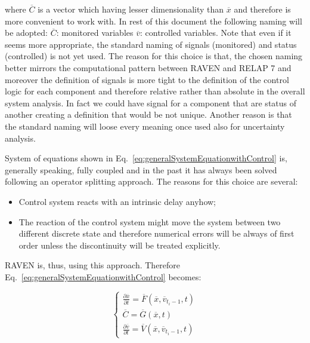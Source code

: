 \documentclass{mc2013}
\begin{document}
where 
$\overline{C}$
is a vector which having lesser dimensionality than
$\overline{x}$
and therefore is more convenient to work with. In rest of this document the following naming will be adopted: $\overline{C}$: monitored variables $\overline{v}$:
controlled variables.
Note that even if it seems more appropriate, the standard naming of signals (monitored)
and status (controlled) is not yet used. The reason for this choice is that, the chosen naming better mirrors
the computational pattern between RAVEN and RELAP 7 and moreover the definition of signals is more
tight to the definition of the control logic for each component and therefore relative rather than absolute in
the overall system analysis. In fact we could have signal for a component that are status of another creating
a definition that would be not unique. Another reason is that the standard naming will loose every meaning
once used also for uncertainty analysis.

\label{sec:operatorSplitting}

System of equations shown in Eq.~\ref{eq:generalSystemEquationwithControl} is, generally speaking, fully coupled and in the past it has always been solved following an operator splitting approach. The reasons for this choice are several:

\begin{itemize}
\item Control system reacts with an intrinsic delay anyhow;
\item The reaction of the control system might move the system between two different discrete state and
therefore numerical errors will be always of first order unless the discontinuity will be treated explicitly.
\end{itemize}

RAVEN is, thus, using this approach. Therefore Eq.~\ref{eq:generalSystemEquationwithControl} becomes:

\begin{equation}
\begin{cases} 
\frac{\partial \overline{x}}{\partial t} = \overline{F}(\overline{x},\overline{v}_{t_{i}-1},t) \\
\overline{C} = \overline{G}(\overline{x},t) \\ 
\frac{\partial \overline{v}}{\partial t} = \overline{V}(\overline{x},\overline{v}_{t_{i}-1},t) 
\end{cases}
\label{eq:generalSystemEquationwithControlSplitting}
\end{equation}
\end{document}
